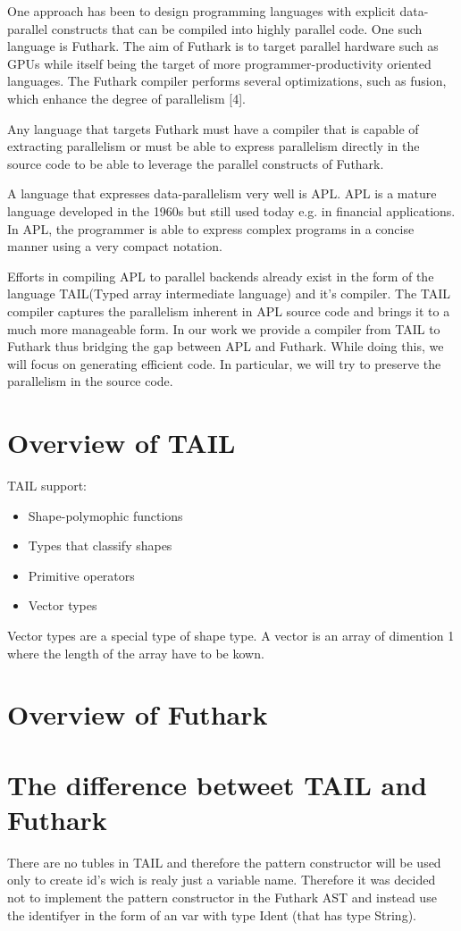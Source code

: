 \documentclass[11pt]{article}
\begin{document}
One approach has been to design programming languages with explicit data-parallel constructs that can be compiled into highly parallel code. One such language is Futhark. The aim of Futhark is to target parallel hardware such as GPUs while itself being the target of more programmer-productivity oriented languages. The Futhark compiler performs several optimizations, such as fusion, which enhance the degree of parallelism [4].

Any language that targets Futhark must have a compiler that is capable of extracting parallelism or must be able to express parallelism directly in the source code to be able to leverage the parallel constructs of Futhark.

A language that expresses data-parallelism very well is APL. APL is a mature language developed in the 1960s but still used today e.g. in financial applications. In APL, the programmer is able to express complex programs in a concise manner using a very compact notation.

Efforts in compiling APL to parallel backends already exist in the form of the  language TAIL(Typed array intermediate language) and it’s compiler. The TAIL compiler captures the parallelism inherent in APL source code and brings it to a much more manageable form. In our work we provide a compiler from TAIL to Futhark thus bridging the gap between APL and Futhark. While doing  this, we will focus on generating efficient code. In particular, we will try to preserve the parallelism in the source code.

\section{Overview of TAIL}
TAIL support:
\begin{itemize}
  \item Shape-polymophic functions 
  \item Types that classify shapes
  \item Primitive operators
  \item Vector types
\end{itemize}

Vector types are a special type of shape type. A vector is an array of dimention 1 where the length of the array have to be kown. 

\section{Overview of Futhark}
\section{The difference betweet TAIL and Futhark}
There are no tubles in TAIL and therefore the pattern constructor will be used only to create id's wich is realy just a variable name. Therefore it was decided not to implement the pattern constructor in the Futhark AST and instead use the identifyer in the form of an var with type Ident (that has type String). 
\end{document}
